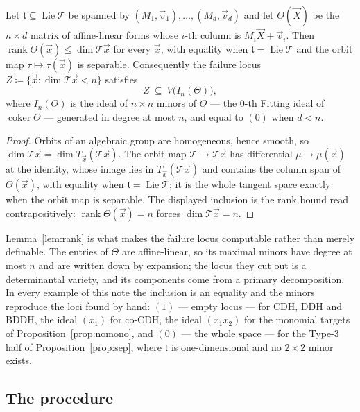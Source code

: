 \documentclass{conjura-solution}
\newcommand{\vx}{\vec{x}}
\newcommand{\vX}{\vec{X}}
\newcommand{\Lie}{\operatorname{Lie}}
\newcommand{\tge}{\mathfrak{t}}
\newcommand{\vvec}{\vec{v}}   %
\newcommand{\rk}{\operatorname{rank}}
\begin{document}
\begin{lemma}
\label{lem:rank}
Let $\tge\subseteq\Lie\mathcal T$ be spanned by $(M_1,\vvec_1),\dots,(M_d,\vvec_d)$ and let
$\Theta(\vX)$ be the $n\times d$ matrix of affine-linear forms whose $i$-th column is
$M_i\vX+\vvec_i$. Then $\rk\Theta(\vx)\le\dim\mathcal T\vx$ for every $\vx$, with equality when
$\tge=\Lie\mathcal T$ and the orbit map $\tau\mapsto\tau(\vx)$ is separable. Consequently the
failure locus $Z\coloneqq\{\vx:\dim\mathcal T\vx<n\}$ satisfies
\[
  Z\ \subseteq\ V\bigl(I_n(\Theta)\bigr),
\]
where $I_n(\Theta)$ is the ideal of $n\times n$ minors of $\Theta$ --- the $0$-th Fitting ideal
of $\operatorname{coker}\Theta$ --- generated in degree at most $n$, and equal to $(0)$ when
$d<n$.
\end{lemma}
\begin{proof}
Orbits of an algebraic group are homogeneous, hence smooth, so
$\dim\mathcal T\vx=\dim T_{\vx}(\mathcal T\vx)$. The orbit map $\mathcal T\to\mathcal T\vx$ has
differential $\mu\mapsto\mu(\vx)$ at the identity, whose image lies in $T_{\vx}(\mathcal T\vx)$
and contains the column span of $\Theta(\vx)$, with equality when $\tge=\Lie\mathcal T$; it is
the whole tangent space exactly when the orbit map is separable. The displayed inclusion is the
rank bound read contrapositively: $\rk\Theta(\vx)=n$ forces $\dim\mathcal T\vx=n$.
\end{proof}

Lemma~\ref{lem:rank} is what makes the failure locus computable rather than merely definable.
The entries of $\Theta$ are affine-linear, so its maximal minors have degree at most $n$ and are
written down by expansion; the locus they cut out is a determinantal variety, and its components
come from a primary decomposition. In every example of this note the inclusion is an equality
and the minors reproduce the loci found by hand: $(1)$ --- empty locus --- for CDH, DDH and
BDDH, the ideal $(x_1)$ for co-CDH, the ideal $(x_1x_2)$ for the monomial targets of
Proposition~\ref{prop:nomono}, and $(0)$ --- the whole space --- for the Type-3 half of
Proposition~\ref{prop:sep}, where $\tge$ is one-dimensional and no $2\times 2$ minor exists.

\subsection{The procedure}
\end{document}
